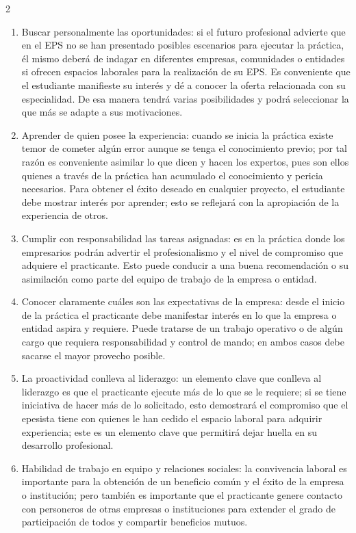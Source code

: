 \documentclass[11pt,spanish,Letterpaper,openany]{book}
\begin{document}
\begin {multicols}{2}
\begin{enumerate}
\def\labelenumi{\alph{enumi}.}
\item
  Buscar personalmente las oportunidades: si el futuro profesional advierte que en el EPS no se han presentado posibles escenarios para ejecutar la práctica, él mismo deberá de indagar en diferentes empresas, comunidades o entidades si ofrecen espacios laborales para la realización de su EPS. Es conveniente que el estudiante manifieste su interés y dé a conocer la oferta relacionada con su especialidad. De esa manera tendrá varias posibilidades y podrá seleccionar la que más se adapte a sus motivaciones.
\item
  Aprender de quien posee la experiencia: cuando se inicia la práctica existe temor de cometer algún error aunque se tenga el conocimiento previo; por tal razón es conveniente asimilar lo que dicen y hacen los expertos, pues son ellos quienes a través de la práctica han acumulado el conocimiento y pericia necesarios. Para obtener el éxito deseado en cualquier proyecto, el estudiante debe mostrar interés por aprender; esto se reflejará con la apropiación de la experiencia de otros.
\item
  Cumplir con responsabilidad las tareas asignadas: es en la práctica donde los empresarios podrán advertir el profesionalismo y el nivel de compromiso que adquiere el practicante. Esto puede conducir a una buena recomendación o su asimilación como parte del equipo de trabajo de la empresa o entidad.
\item
  Conocer claramente cuáles son las expectativas de la empresa: desde el inicio de la práctica el practicante debe manifestar interés en lo que la empresa o entidad aspira y requiere. Puede tratarse de un trabajo operativo o de algún cargo que requiera responsabilidad y control de mando; en ambos casos debe sacarse el mayor provecho posible.
\item
  La proactividad conlleva al liderazgo: un elemento clave que conlleva al liderazgo es que el practicante ejecute más de lo que se le requiere; si se tiene iniciativa de hacer más de lo solicitado, esto demostrará el compromiso que el epesista tiene con quienes le han cedido el espacio laboral para adquirir experiencia; este es un elemento clave que permitirá dejar huella en su desarrollo profesional.
\item
  Habilidad de trabajo en equipo y relaciones sociales: la convivencia laboral es importante para la obtención de un beneficio común y el éxito de la empresa o institución; pero también es importante que el practicante genere contacto con personeros de otras empresas o instituciones para extender el grado de participación de todos y compartir beneficios mutuos.

\end{enumerate}
\end{multicols}
\end{document}
